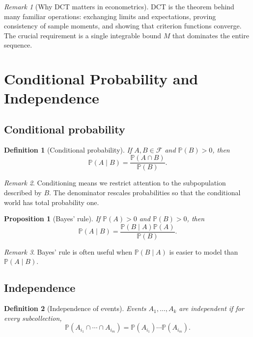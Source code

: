 \documentclass[11pt]{article}
\newtheorem{definition}{Definition}[section]
\newtheorem{proposition}{Proposition}[section]
\theoremstyle{remark}
\newtheorem{remark}{Remark}[section]
\newcommand{\PP}{\mathbb{P}}
\newcommand{\1}{\mathbbm{1}}
\newcommand{\cF}{\mathcal{F}}
\begin{document}
\begin{remark}[Why DCT matters in econometrics]
DCT is the theorem behind many familiar operations: exchanging limits and expectations, proving consistency of sample moments, and showing that criterion functions converge. The crucial requirement is a single integrable bound \(M\) that dominates the entire sequence.
\end{remark}

\section{Conditional Probability and Independence}

\subsection{Conditional probability}

\begin{definition}[Conditional probability]
If \(A,B \in \cF\) and \(\PP(B)>0\), then
\[
  \PP(A \mid B) = \frac{\PP(A \cap B)}{\PP(B)}.
\]
\end{definition}

\begin{remark}
Conditioning means we restrict attention to the subpopulation described by \(B\). The denominator rescales probabilities so that the conditional world has total probability one.
\end{remark}

\begin{proposition}[Bayes' rule]
If \(\PP(A)>0\) and \(\PP(B)>0\), then
\[
  \PP(A \mid B)=\frac{\PP(B \mid A)\PP(A)}{\PP(B)}.
\]
\end{proposition}

\begin{remark}
Bayes' rule is often useful when \(\PP(B \mid A)\) is easier to model than \(\PP(A \mid B)\).
\end{remark}

\subsection{Independence}

\begin{definition}[Independence of events]
Events \(A_1,\dots,A_k\) are independent if for every subcollection,
\[
  \PP(A_{i_1}\cap \cdots \cap A_{i_m}) = \PP(A_{i_1})\cdots \PP(A_{i_m}).
\]
\end{definition}
\end{document}
